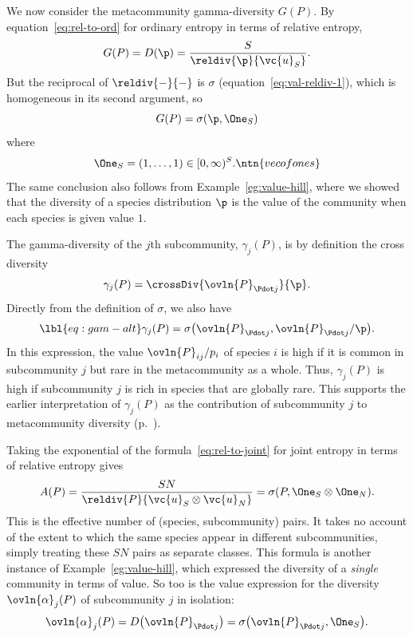 We now consider the metacommunity gamma-diversity $G(P)$.  By
equation~\eqref{eq:rel-to-ord} for ordinary entropy in terms of relative
entropy,
\[
G(P)
=
D(\p)
=
\frac{S}{\reldiv{\p}{\vc{u}_S}}.
\]
But the reciprocal of $\reldiv{-}{-}$ is $\sigma$
(equation~\eqref{eq:val-reldiv-1}), which is homogeneous in its second
argument, so
\[
G(P) = \sigma(\p, \One_S)
\]
where 
\[
\One_S = (1, \ldots, 1) \in [0, \infty)^S.  
\ntn{vecofones}
\]
The same conclusion also follows from Example~\ref{eg:value-hill}, where we
showed that the diversity of a species distribution $\p$ is the value of
the community when each species is given value $1$.

The gamma-diversity of the $j$th subcommunity, $\gamma_j(P)$, is by
definition the cross diversity
\[
\gamma_j(P) = \crossDiv{\ovln{P}_{\Pdot j}}{\p}.
\]
Directly from the definition of $\sigma$, we also have
% 
\begin{equation}
\lbl{eq:gam-alt}
\index{value!gamma-diversity@and gamma-diversity}
\gamma_j(P)
=
\sigma\bigl(\ovln{P}_{\Pdot j}, \ovln{P}_{\Pdot j}/\p\bigr).
\end{equation}
% 
In this expression, the value $\ovln{P}_{ij}/p_i$ of species $i$ is high if
it is common in subcommunity $j$ but rare in the metacommunity as a whole.
Thus, $\gamma_j(P)$ is high if subcommunity $j$ is rich in species that are
globally rare.  This supports the earlier interpretation of $\gamma_j(P)$
as the contribution of subcommunity $j$ to metacommunity diversity
(p.~\pageref{p:gamma-contrib}).

Taking the exponential of the formula~\eqref{eq:rel-to-joint} for joint
entropy in terms of relative entropy gives
\[
\index{value!alpha-diversity@and alpha-diversity}
A(P)
=
\frac{SN}{\reldiv{P}{\vc{u}_S \otimes \vc{u}_N}}
=
\sigma(P, \One_S \otimes \One_N).
\]
This is the effective number of (species, subcommunity) pairs.  It takes no
account of the extent to which the same species appear in different
subcommunities, simply treating these $SN$ pairs as separate classes.  This
formula is another instance of Example~\ref{eg:value-hill}, which expressed
the diversity of a \emph{single} community in terms of value.  So too is
the value expression for the diversity $\ovln{\alpha}_j(P)$ of subcommunity
$j$ in isolation:
\[
\ovln{\alpha}_j(P)
=
D\bigl(\ovln{P}_{\Pdot j}\bigr)
=
\sigma\bigl(\ovln{P}_{\Pdot j}, \One_S\bigr).
\]

